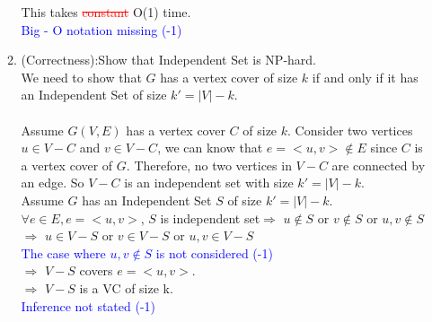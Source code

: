 \documentclass{article}%
\newcommand{\add}[1]{\textcolor{dkgreen}{#1}}
\newcommand{\rmv}[1]{\textcolor{red}{\sout{#1}}}
\newcommand{\moveto}[1]{\textcolor{blue}{#1}}
\begin{document}
\begin{enumerate}
\begin{enumerate}
 This takes \rmv {constant} \add{O(1)} time.\\
 \moveto { Big - O notation missing  (-1) }
	
	\item (Correctness):Show that Independent Set is NP-hard.
	\\We need to show that $G$ has a vertex cover of size $k$ if and only if it has an Independent Set of size $k'=|V|-k$.\\
	\\Assume $G(V,E)$ has a vertex cover $C$ of size $k$. Consider two vertices $u\in V-C$ and $v\in V-C$, we can know that $e=<u,v>\notin E$ since $C$ is a vertex cover of $G$. Therefore, no two vertices in $V-C$ are connected by an edge. So $V-C$ is an independent set with size $k'=|V|-k$.\\	
		
	Assume $G$ has an Independent Set $S$ of size $k'=|V|-k$.
	\\$\forall e\in E, e=<u,v>$, $S$ is independent set$\Rightarrow$ $u\notin S$ or $v\notin S$ or \add{$u,v \notin S$ } $\Rightarrow$ $u\in V-S$ or $v\in V-S$ or \add{ $u,v \in V-S$} \\
\moveto{ The case where $u,v \notin S$ is not considered   (-1)} \\
 $\Rightarrow$ $V-S$ covers $e=<u,v>$.\\
 \add {$\Rightarrow$ $V-S$ is a VC of size k.} \\
 \moveto {Inference not stated  (-1) } \\
	
\end{enumerate}
\end{enumerate}
\end{document}
